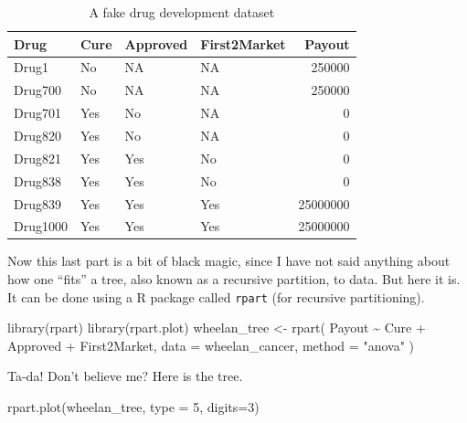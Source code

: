 \documentclass[
  openany]{book}
\newenvironment{Shaded}{\begin{snugshade}}{\end{snugshade}}
\newcommand{\AttributeTok}[1]{\textcolor[rgb]{0.77,0.63,0.00}{#1}}
\newcommand{\DecValTok}[1]{\textcolor[rgb]{0.00,0.00,0.81}{#1}}
\newcommand{\FunctionTok}[1]{\textcolor[rgb]{0.00,0.00,0.00}{#1}}
\newcommand{\NormalTok}[1]{#1}
\newcommand{\OtherTok}[1]{\textcolor[rgb]{0.56,0.35,0.01}{#1}}
\newcommand{\SpecialCharTok}[1]{\textcolor[rgb]{0.00,0.00,0.00}{#1}}
\newcommand{\StringTok}[1]{\textcolor[rgb]{0.31,0.60,0.02}{#1}}
\begin{document}
\begin{table}[!h]

\caption{\label{tab:unnamed-chunk-26}A fake drug development dataset}
\centering
\begin{tabular}[t]{llllr}
\toprule
Drug & Cure & Approved & First2Market & Payout\\
\midrule
Drug1 & No & NA & NA & 250000\\
Drug700 & No & NA & NA & 250000\\
Drug701 & Yes & No & NA & 0\\
Drug820 & Yes & No & NA & 0\\
Drug821 & Yes & Yes & No & 0\\
\addlinespace
Drug838 & Yes & Yes & No & 0\\
Drug839 & Yes & Yes & Yes & 25000000\\
Drug1000 & Yes & Yes & Yes & 25000000\\
\bottomrule
\end{tabular}
\end{table}

Now this last part is a bit of black magic, since I have not said anything about how one ``fits'' a tree, also known as a recursive partition, to data. But here it is. It can be done using a R package called \texttt{rpart} (for recursive partitioning).

\begin{Shaded}
\begin{Highlighting}[]
\FunctionTok{library}\NormalTok{(rpart)}
\FunctionTok{library}\NormalTok{(rpart.plot)}
\NormalTok{wheelan\_tree }\OtherTok{\textless{}{-}} \FunctionTok{rpart}\NormalTok{(}
\NormalTok{  Payout }\SpecialCharTok{\textasciitilde{}}\NormalTok{ Cure }\SpecialCharTok{+}\NormalTok{ Approved }\SpecialCharTok{+}\NormalTok{ First2Market, }
  \AttributeTok{data =}\NormalTok{ wheelan\_cancer, }
  \AttributeTok{method =} \StringTok{"anova"}
\NormalTok{)}
\end{Highlighting}
\end{Shaded}

Ta-da! Don't believe me? Here is the tree.

\begin{Shaded}
\begin{Highlighting}[]
\FunctionTok{rpart.plot}\NormalTok{(wheelan\_tree, }\AttributeTok{type =} \DecValTok{5}\NormalTok{, }\AttributeTok{digits=}\DecValTok{3}\NormalTok{)}
\end{Highlighting}
\end{Shaded}
\end{document}
